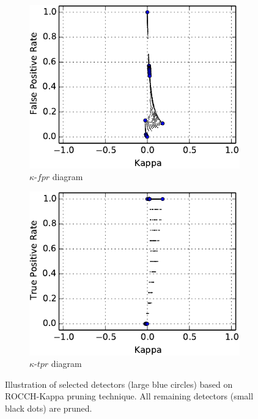 \begin{figure}[tbh]
    \centering
    \begin{adjustbox}{minipage=\linewidth,scale=0.8}
    \begin{subfigure}[b]{\columnwidth}
        \centering
        \includegraphics[width=\linewidth]{figs/ROCCH-GT-Kappa-fpr-selected-crop}
        \caption{$\kappa$-$fpr$ diagram}
        \label{fig:ROCCH-Kappa-fpr}
    \vspace{0.7cm}
    \end{subfigure}
    \begin{subfigure}[b]{\columnwidth}
        \centering
        \includegraphics[width=\linewidth]{figs/ROCCH-GT-Kappa-tpr-selected-crop}
        \caption{$\kappa$-$tpr$ diagram}
        \label{fig:ROCCH-Kappa-tpr}
    \end{subfigure}
    \caption{Illustration of selected detectors (large blue circles) based on ROCCH-Kappa pruning technique. All remaining detectors (small black dots) are pruned.}
    \label{fig:ROCCH-Kappa-fpr-tpr}
    \end{adjustbox}
\end{figure}

